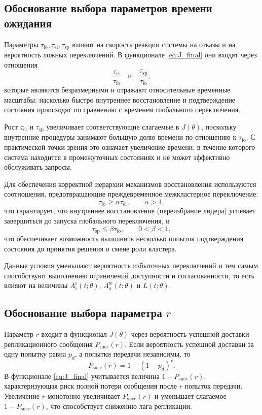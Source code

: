 \subsection{Обоснование выбора параметров времени ожидания}

Параметры $\tau_{\mathrm{fo}}, \tau_{\mathrm{el}}, \tau_{\mathrm{sp}}$
влияют на скорость реакции системы на отказы и на вероятность ложных переключений.
В функционале \eqref{eq:J_final} они входят через отношения
\[
\frac{\tau_{\mathrm{el}}}{\tau_{\mathrm{fo}}}
\quad \text{и} \quad
\frac{\tau_{\mathrm{sp}}}{\tau_{\mathrm{fo}}},
\]
которые являются безразмерными и отражают относительные временные масштабы:
насколько быстро внутреннее восстановление и подтверждение состояния
происходят по сравнению с временем глобального переключения.

Рост $\tau_{\mathrm{el}}$ и $\tau_{\mathrm{sp}}$ увеличивает соответствующие слагаемые
в $J(\theta)$, поскольку внутренние процедуры занимают большую долю времени
по отношению к $\tau_{\mathrm{fo}}$.
С практической точки зрения это означает увеличение времени,
в течение которого система находится в промежуточных состояниях
и не может эффективно обслуживать запросы.

Для обеспечения корректной иерархии механизмов восстановления
используются соотношения, предотвращающие преждевременное межкластерное переключение:
\[
\tau_{\mathrm{fo}} \ge \alpha \tau_{\mathrm{el}}, \qquad \alpha>1,
\]
что гарантирует, что внутреннее восстановление (переизбрание лидера)
успевает завершиться до запуска глобального переключения,
и
\[
\tau_{\mathrm{sp}} \le \beta \tau_{\mathrm{fo}}, \qquad 0<\beta<1,
\]
что обеспечивает возможность выполнить несколько попыток подтверждения состояния
до принятия решения о смене роли кластера.

Данные условия уменьшают вероятность избыточных переключений и тем самым
способствуют выполнению ограничений доступности и согласованности,
то есть влияют на величины
$A_i^{\mathrm{r}}(t;\theta)$,
$A_a^{\mathrm{w}}(t;\theta)$
и
$L(t;\theta)$.

\subsection{Обоснование выбора параметра $r$}

Параметр $r$ входит в функционал $J(\theta)$ через вероятность успешной доставки
репликационного сообщения $P_{\mathrm{succ}}(r)$.
Если вероятность успешной доставки за одну попытку равна $p_d$,
а попытки передачи независимы, то
\[
P_{\mathrm{succ}}(r)=1-(1-p_d)^r.
\]
В функционале \eqref{eq:J_final} учитывается величина $1-P_{\mathrm{succ}}(r)$,
характеризующая риск полной потери сообщения после $r$ попыток передачи.
Увеличение $r$ монотонно увеличивает $P_{\mathrm{succ}}(r)$ и уменьшает
слагаемое $1-P_{\mathrm{succ}}(r)$, что способствует снижению лага репликации.

